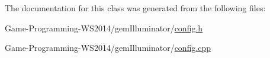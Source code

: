 The documentation for this class was generated from the following files\+:\begin{DoxyCompactItemize}
\item 
Game-\/\+Programming-\/\+W\+S2014/gem\+Illuminator/\hyperlink{config_8h}{config.\+h}\item 
Game-\/\+Programming-\/\+W\+S2014/gem\+Illuminator/\hyperlink{config_8cpp}{config.\+cpp}\end{DoxyCompactItemize}
